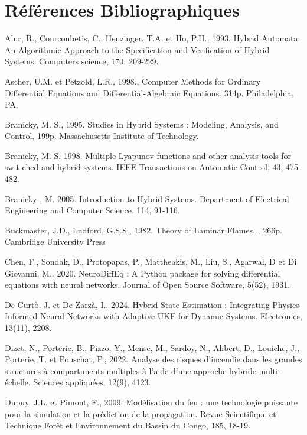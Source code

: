 \documentclass[12pt, oneside]{report} %
\theoremstyle{definition}
\theoremstyle{remark}
\begin{document}
	
	\clearpage
	\chapter*{Références Bibliographiques}
	\begin{enumerate}[label={[\arabic*]}, leftmargin=*, align=left, nosep]
		
		\item Alur, R., Courcoubetis, C., Henzinger, T.A. et Ho, P.H., 1993. Hybrid Automata: An Algorithmic Approach to the Specification and Verification of Hybrid Systems. Computers science, 170, 209-229.
		\item Ascher, U.M. et Petzold, L.R., 1998., Computer Methods for Ordinary Differential Equations and Differential-Algebraic Equations. 314p. Philadelphia, PA.
		\item Branicky, M. S., 1995. Studies in Hybrid Systems : Modeling, Analysis, and Control, 199p. Massachusetts Institute of Technology.
		\item Branicky, M. S. 1998. Multiple Lyapunov functions and other analysis tools for swit-ched and hybrid systems. IEEE Transactions on Automatic Control, 43, 475-482.
		\item Branicky , M. 2005. Introduction to Hybrid Systems. Department of Electrical Engineering and Computer Science. 114, 91-116.
		\item Buckmaster, J.D., Ludford, G.S.S., 1982. Theory of Laminar Flames. , 266p. Cambridge University Press
		\item Chen, F., Sondak, D., Protopapas, P., Mattheakis, M., Liu, S., Agarwal, D et  Di Giovanni, M.. 2020. NeuroDiffEq : A Python package for solving differential equations with neural networks. Journal of Open Source Software, 5(52), 1931.
		\item De Curtò, J. et De Zarzà, I., 2024. Hybrid State Estimation : Integrating Physics-Informed Neural Networks with Adaptive UKF for Dynamic Systems. Electronics, 13(11), 2208.
		\item Dizet, N., Porterie, B., Pizzo, Y., Mense, M., Sardoy, N., Alibert, D., Louiche, J., Porterie, T. et Pouschat, P., 2022. Analyse des risques d’incendie dans les grandes structures à compartiments multiples à l’aide d’une approche hybride multi-échelle. Sciences appliquées, 12(9), 4123.
		\item Dupuy, J.L. et Pimont, F., 2009. Modélisation du feu : une technologie puissante pour la simulation et la prédiction de la propagation. Revue Scientifique et Technique Forêt et Environnement du Bassin du Congo, 185, 18-19.

\end{enumerate}
\end{document}
